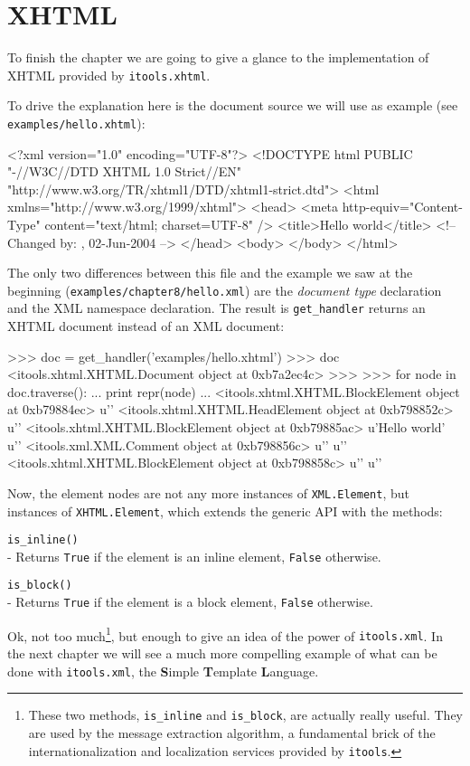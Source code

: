 \section{XHTML}

To finish the chapter we are going to give a glance to the implementation
of XHTML provided by {\tt itools.xhtml}.

To drive the explanation here is the document source we will use as example
(see {\tt examples/hello.xhtml}):

\begin{code}
    <?xml version="1.0" encoding="UTF-8"?>
    <!DOCTYPE html PUBLIC "-//W3C//DTD XHTML 1.0 Strict//EN"
           "http://www.w3.org/TR/xhtml1/DTD/xhtml1-strict.dtd">
    <html xmlns="http://www.w3.org/1999/xhtml">
      <head>
        <meta http-equiv="Content-Type" content="text/html; charset=UTF-8" />
        <title>Hello world</title>
        <!-- Changed by: , 02-Jun-2004 -->
      </head>
      <body>
      </body>
    </html>
\end{code}

The only two differences between this file and the example we saw at the
beginning ({\tt examples/chapter8/hello.xml}) are the {\em document type}
declaration and the XML namespace declaration. The result is {\tt get\_handler}
returns an XHTML document instead of an XML document:

\begin{code}
    >>> doc = get_handler('examples/hello.xhtml')
    >>> doc
    <itools.xhtml.XHTML.Document object at 0xb7a2ec4c>
    >>> 
    >>> for node in doc.traverse():
    ...     print repr(node)
    ... 
    <itools.xhtml.XHTML.BlockElement object at 0xb79884ec>
    u'\n  '
    <itools.xhtml.XHTML.HeadElement object at 0xb798852c>
    u'\n    \n    '
    <itools.xhtml.XHTML.BlockElement object at 0xb79885ac>
    u'Hello world'
    u'\n    '
    <itools.xml.XML.Comment object at 0xb798856c>
    u'\n  '
    u'\n  '
    <itools.xhtml.XHTML.BlockElement object at 0xb798858c>
    u'\n  '
    u'\n'
\end{code}

Now, the element nodes are not any more instances of {\tt XML.Element}, but
instances of {\tt XHTML.Element}, which extends the generic API with the
methods:

\begin{api}
    {\tt is\_inline()}\\
    - Returns {\tt True} if the element is an inline element, {\tt False}
    otherwise.

    {\tt is\_block()}\\
    - Returns {\tt True} if the element is a block element, {\tt False}
    otherwise.
\end{api}

Ok, not too much\footnote{These two methods, {\tt is\_inline} and
{\tt is\_block}, are actually really useful. They are used by the message
extraction algorithm, a fundamental brick of the internationalization and
localization services provided by {\tt itools}.}, but enough to give an
idea of the power of {\tt itools.xml}. In the next chapter we will see a
much more compelling example of what can be done with {\tt itools.xml},
the {\bf S}imple {\bf T}emplate {\bf L}anguage.


